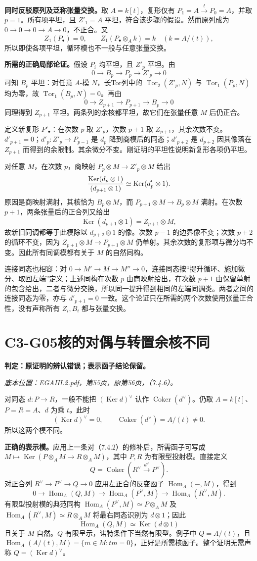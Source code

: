 \documentclass[UTF8,a4paper]{ctexbook}
\DeclareMathOperator{\Hom}{Hom}
\DeclareMathOperator{\Ker}{Ker}
\DeclareMathOperator{\Coker}{Coker}
\let\Im\relax
\DeclareMathOperator{\Im}{Im}
\DeclareMathOperator{\Tor}{Tor}
\newcommand{\source}[1]{\par\smallskip\noindent\textit{底本位置：#1。}\par\smallskip}
\newcommand{\audit}[3]{\Needspace{5\baselineskip}\hypertarget{audit:#1}{}\section*{#1\quad #2}\addcontentsline{toc}{section}{#1\quad #2}\noindent\textbf{判定：#3。}\par\smallskip}
\begin{document}
\textbf{同时反驳原列及泛称张量交换。}取 $A=k[t]$，复形仅有 $P_1=A\xrightarrow{t}P_0=A$，并取 $p=1$。所有项平坦，且 $Z'_1=A$ 平坦，符合该步骤的假设。然而原列成为 $0\to0\to0\to A\to0$，不正合。又
\[
 Z_1(P_\bullet)=0,
 \qquad Z_1(P_\bullet\otimes_A k)=k
 \quad(k=A/(t)),
\]
所以即使各项平坦，循环模也不一般与任意张量交换。

\textbf{所需的正确局部论证。}假设 $P_i$ 均平坦，且 $Z'_p$ 平坦。由
\[
 0\to B_p\to P_p\to Z'_p\to0
\]
可知 $B_p$ 平坦：对任意 $A$-模 $N$，长Tor列中的 $\Tor_2(Z'_p,N)$ 与 $\Tor_1(P_p,N)$ 均为零，故 $\Tor_1(B_p,N)=0$。再由
\[
 0\to Z_{p+1}\to P_{p+1}\to B_p\to0
\]
同理得到 $Z_{p+1}$ 平坦。两条列的余核都平坦，故它们在张量任意 $M$ 后仍正合。

定义新复形 $P'_\bullet$：在次数 $p$ 取 $Z'_p$，次数 $p+1$ 取 $Z_{p+1}$，其余次数不变。$d'_{p+1}=0$；$d'_p:Z'_p\to P_{p-1}$ 是 $d_p$ 降到商模后的同态；$d'_{p+2}$ 是 $d_{p+2}$ 因其像落在 $Z_{p+1}$ 而得到的余限制。其余微分不变。刚证明的平坦性说明新复形各项仍平坦。

对任意 $M$，在次数 $p$，商映射 $P_p\otimes M\to Z'_p\otimes M$ 给出
\[
 \frac{\Ker(d_p\otimes1)}{\Im(d_{p+1}\otimes1)}
 \simeq\Ker(d'_p\otimes1).
\]
原因是商映射满射，其核恰为 $B_p\otimes M$，而 $P_{p+1}\otimes M\to B_p\otimes M$ 满射。在次数 $p+1$，两条张量后的正合列又给出
\[
 \Ker(d_{p+1}\otimes1)=Z_{p+1}\otimes M,
\]
故新旧同调都等于此模除以 $d_{p+2}\otimes1$ 的像。次数 $p-1$ 的边界像不变；次数 $p+2$ 的循环不变，因为 $Z_{p+1}\otimes M\to P_{p+1}\otimes M$ 仍单射。其余次数的复形项与微分均不变。因此所有同调模都有关于 $M$ 的自然同构。

连接同态也相容：对 $0\to M'\to M\to M''\to0$，连接同态按“提升循环、施加微分、取回左端”定义；上述同构在次数 $p$ 由商映射给出，在次数 $p+1$ 由保留单射的包含给出，二者与微分交换，所以同一提升得到相同的左端同调类。两者之间的连接同态为零，亦与 $d'_{p+1}=0$ 一致。这个论证只在所需的两个次数使用张量正合性，没有声称所有 $Z_i,B_i$ 都与张量交换。

\audit{C3-G05}{核的对偶与转置余核不同}{原证明的辨认错误；表示函子结论保留}
\source{EGAIII.2.pdf，第55页，原第56页，（7.4.6）}
对同态 $d:P\to R$，一般不能把 $(\Ker d)^\vee$ 认作 $\Coker(d^\vee)$。仍取 $A=k[t]$、$P=R=A$、$d$ 为乘 $t$。此时
\[
 (\Ker d)^\vee=0,
 \qquad\Coker(d^\vee)=A/(t)\ne0.
\]
所以这两个模不同。

\textbf{正确的表示模。}应用上一条对（7.4.2）的修补后，所需函子可写成 $M\mapsto\Ker(P\otimes_A M\to R\otimes_A M)$，其中 $P,R$ 为有限型投射模。直接定义
\[
 Q=\Coker(R^\vee\xrightarrow{d^\vee}P^\vee).
\]
对正合列 $R^\vee\to P^\vee\to Q\to0$ 应用左正合的反变函子 $\Hom_A(-,M)$，得到
\[
 0\to\Hom_A(Q,M)\to\Hom_A(P^\vee,M)
 \to\Hom_A(R^\vee,M).
\]
有限型投射模的典范同构 $\Hom_A(P^\vee,M)\simeq P\otimes_A M$ 及 $\Hom_A(R^\vee,M)\simeq R\otimes_A M$ 将最右同态识别为 $d\otimes1$；因此
\[
 \Hom_A(Q,M)\simeq\Ker(d\otimes1)
\]
且关于 $M$ 自然。$Q$ 有限呈示，诺特条件下当然有限型。例子中 $Q=A/(t)$，且 $\Hom_A(A/(t),M)=\{m\in M:tm=0\}$，正好是所需核函子。整个证明无需声称 $Q=(\Ker d)^\vee$。
\end{document}
